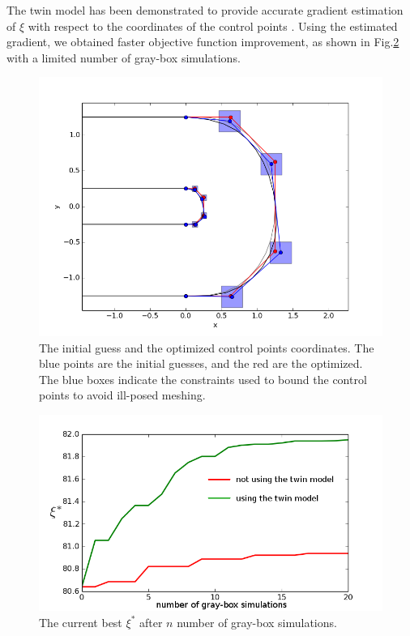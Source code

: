 \documentclass[a4paper,onecolumn]{article}
\theoremstyle{remark}
\begin{document}
The twin model has been demonstrated to provide accurate gradient estimation of $\xi$
with respect to the coordinates of the control points \cite{twin model}. 
Using the estimated gradient, we obtained faster objective function improvement, as shown 
in Fig.\ref{fig:opt_NS} with a limited number of gray-box simulations. 
\begin{figure}[H]\begin{center}
    \includegraphics[width=12cm]{opt_Ubend.png}
    \caption{The initial guess and the optimized control points coordinates. The blue points
     are the initial guesses, and the red are the optimized. The blue boxes indicate the
     constraints used to bound the control points to avoid ill-posed meshing.} 
    \label{fig:opt_Ubend}
\end{center}
\end{figure}

\begin{figure}[H]\begin{center}
    \includegraphics[width=12cm]{opt_NS.png}
    \caption{The current best $\xi^*$ after $n$ number of gray-box simulations. } 
    \label{fig:opt_NS}
\end{center}
\end{figure}
\end{document}
